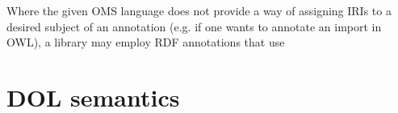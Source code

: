 \documentclass[10pt,fleqn,%
\ifpretendfinal
final%
\else
draft%
\fi,
]{scrreprt}
\makeatletter
\newcommand*{\eg}{e.g.\@\xspace}
\newcommand*{\CL}{\ensuremath{\mathsf{CL}}\xspace}
\newcommand{\clause}[1]{\chapter{#1}}
\makeatother
\begin{document}
Where the given OMS language does not provide a way of assigning IRIs to a desired subject of an annotation (\eg if one wants to annotate an import in OWL), a library may employ RDF annotations that use 

\clause{DOL semantics}\label{c:semantics}

%
%

\end{document}
